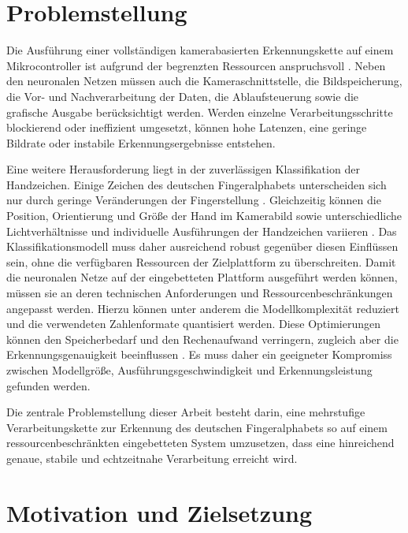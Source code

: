 \section{Problemstellung}\label{sec:problemstellung}

Die Ausführung einer vollständigen kamerabasierten Erkennungskette auf einem Mikrocontroller ist aufgrund der begrenzten Ressourcen anspruchsvoll \cite[S. 10ff.]{abadadeComprehensiveSurveyTinyML2023}. Neben den neuronalen Netzen müssen auch die Kameraschnittstelle, die Bildspeicherung, die Vor- und Nachverarbeitung der Daten, die Ablaufsteuerung sowie die grafische Ausgabe berücksichtigt werden. Werden einzelne Verarbeitungsschritte blockierend oder ineffizient umgesetzt, können hohe Latenzen, eine geringe Bildrate oder instabile Erkennungsergebnisse entstehen.

Eine weitere Herausforderung liegt in der zuverlässigen Klassifikation der Handzeichen. Einige Zeichen des deutschen Fingeralphabets unterscheiden sich nur durch geringe Veränderungen der Fingerstellung \cite{DeutscheGebaerdensprache}. Gleichzeitig können die Position, Orientierung und Größe der Hand im Kamerabild sowie unterschiedliche Lichtverhältnisse und individuelle Ausführungen der Handzeichen variieren \cite{benitez-garciaIPNHandVideo2021}. Das Klassifikationsmodell muss daher ausreichend robust gegenüber diesen Einflüssen sein, ohne die verfügbaren Ressourcen der Zielplattform zu überschreiten. Damit die neuronalen Netze auf der eingebetteten Plattform ausgeführt werden können, müssen sie an deren technischen Anforderungen und Ressourcenbeschränkungen angepasst werden. Hierzu können unter anderem die Modellkomplexität reduziert und die verwendeten Zahlenformate quantisiert werden. Diese Optimierungen können den Speicherbedarf und den Rechenaufwand verringern, zugleich aber die Erkennungsgenauigkeit beeinflussen \cite[S. 1]{jacobQuantizationTrainingNeural2018}. Es muss daher ein geeigneter Kompromiss zwischen Modellgröße, Ausführungsgeschwindigkeit und Erkennungsleistung gefunden werden.

Die zentrale Problemstellung dieser Arbeit besteht darin, eine mehrstufige Verarbeitungskette zur Erkennung des deutschen Fingeralphabets so auf einem ressourcenbeschränkten eingebetteten System umzusetzen, dass eine hinreichend genaue, stabile und echtzeitnahe Verarbeitung erreicht wird.

\section{Motivation und Zielsetzung}\label{sec:motivation}

